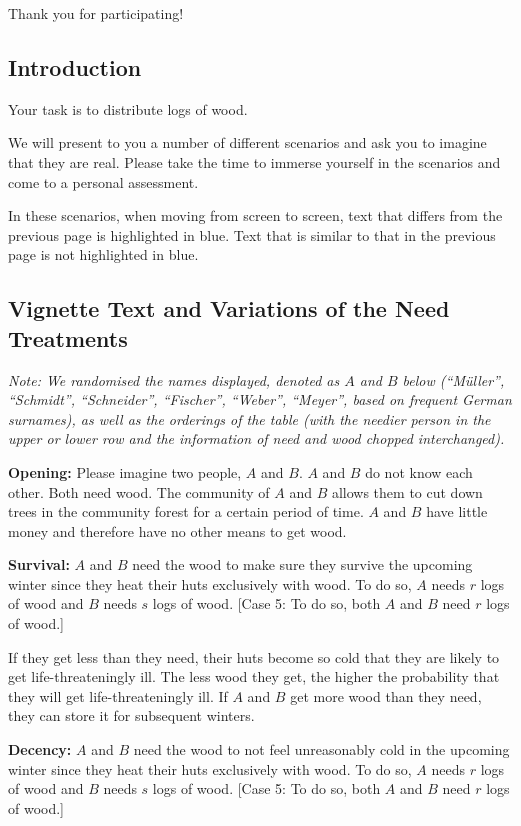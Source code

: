 \documentclass[egregdoesnotlikesansseriftitles]{scrartcl}
\begin{document}
Thank you for participating!


\subsection*{Introduction}
Your task is to distribute logs of wood.

We will present to you a number of different scenarios and ask you to imagine that they are real.
Please take the time to immerse yourself in the scenarios and come to a personal assessment.

In these scenarios, when moving from screen to screen, text that differs from the previous page is highlighted in blue.
Text that is similar to that in the previous page is not highlighted in blue.

\subsection*{Vignette Text and Variations of the Need Treatments}
\noindent\textit{Note: We randomised the names displayed, denoted as $A$ and $B$ below (``Müller'', ``Schmidt'', ``Schneider'', ``Fischer'', ``Weber'', ``Meyer'', based on frequent German surnames), as well as the orderings of the table (with the needier person in the upper or lower row and the information of need and wood chopped interchanged).}\vspace{2ex}

\noindent\textbf{Opening:} Please imagine two people, $A$ and $B$.
$A$ and $B$ do not know each other.
Both need wood.
The community of $A$ and $B$  allows them to cut down trees in the community forest for a certain period of time.
$A$ and $B$ have little money and therefore have no other means to get wood.\vspace{2ex}

\noindent\textbf{Survival:} $A$ and $B$ need the wood to make sure they survive the upcoming winter since they heat their huts exclusively with wood.
To do so, $A$ needs $r$ logs of wood and $B$ needs $s$ logs of wood.
[Case 5: To do so, both $A$ and $B$ need $r$ logs of wood.]

If they get less than they need, their huts become so cold that they are likely to get life-threateningly ill.
The less wood they get, the higher the probability that they will get life-threateningly ill.
If $A$ and $B$ get more wood than they need, they can store it for subsequent winters.\vspace{2ex}

\noindent\textbf{Decency:} $A$ and $B$ need the wood to not feel unreasonably cold in the upcoming winter since they heat their huts exclusively with wood.
To do so, $A$ needs $r$ logs of wood and $B$ needs $s$ logs of wood.
[Case 5: To do so, both $A$ and $B$ need $r$ logs of wood.]
\end{document}
